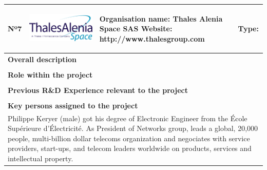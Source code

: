 \begin{longtable}[H]{|p{0.7cm}|p{4cm}|p{7cm}|p{1.3cm}|}
	\hline
	\begin{center} Nº7 \end{center} & \begin{center} \includegraphics[scale=0.25]{./logos/Thales_Alenia_Space_Belgium_logo} \end{center} & \begin{center} \textbf{Organisation name:} Thales Alenia Space SAS \newline \textbf{Website:} http://www.thalesgroup.com \end{center} & \begin{center} Type: \end{center} \\ \hline
	
	\multicolumn{4}{|p{13cm}|}{\textbf{Overall description}}  \\ \hline
	
	\multicolumn{4}{|p{14.5cm}|}{}  \\ \hline
	
	\multicolumn{4}{|p{13cm}|}{\textbf{Role within the project}}   \\ \hline
	
	\multicolumn{4}{|p{14.5cm}|}{}  \\ \hline
	
	\multicolumn{4}{|p{13cm}|}{\textbf{Previous R\&D Experience relevant to the project}}  \\ \hline
	
	\multicolumn{4}{|p{14.5cm}|}{}  \\ \hline
	
	\multicolumn{4}{|p{13cm}|}{\textbf{Key persons assigned to the project}}   \\ \hline
	
	\multicolumn{4}{|p{14.5cm}|}{Philippe Keryer (male) got his degree of Electronic Engineer from the École Supérieure d'Électricité. As President of Networks group, leads a global, 20,000 people, multi-billion dollar telecoms organization and negociates with service providers, start-ups, and telecom leaders worldwide on products, services and intellectual property.}  \\ \hline
	

\end{longtable}
